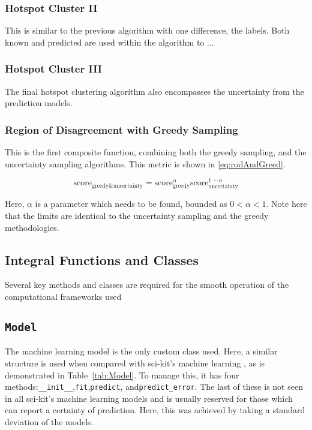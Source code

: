 \subsubsection{Hotspot Cluster II}
This is similar to the previous algorithm with one difference, the labels. Both known and predicted are used within the algorithm to ...

\subsubsection{Hotspot Cluster III}
The final hotspot clustering algorithm also encompasses the uncertainty from the prediction models.

\subsubsection{Region of Disagreement with Greedy Sampling}
This is the first composite function, combining both the greedy sampling, and the uncertainty sampling algorithms. This metric is shown in \ref{eq:rodAndGreed}.

\begin{equation}
    \label{eq:rodAndGreed}
    {\mathrm{score}_\mathrm{greedy\&uncertainty}=\mathrm{score}_\mathrm{greedy}^{\alpha}\mathrm{score}_\mathrm{uncertainty}^{1-\alpha}}
\end{equation}

Here, $\alpha$ is a parameter which needs to be found, bounded as $0<\alpha{}<1$. Note here that the limits are identical to the uncertainty sampling and the greedy methodologies.


\subsection{Integral Functions and Classes}
Several key methods and classes are required for the smooth operation of the computational frameworks used




\subsection{\lstinline{Model}}
The machine learning model is the only custom class used. Here, a similar structure is used when compared with sci-kit's machine learning \cite{scikit}, as is demonstrated in Table~\ref{tab:Model}. To manage this, it has four methods:\lstinline{__init__},\lstinline{fit},\lstinline{predict}, and\lstinline{predict_error}. The last of these is not seen in all sci-kit's machine learning models and is usually reserved for those which can report a certainty of prediction. Here, this was achieved by taking a standard deviation of the models.

